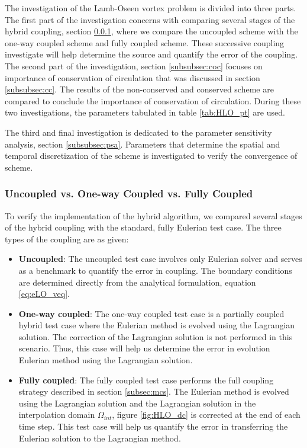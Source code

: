 The investigation of the Lamb-Oseen vortex problem is divided into three parts. The first part of the investigation concerns with comparing several stages of the hybrid coupling, section \ref{subsec:UvOvF}, where we compare the uncoupled scheme with the one-way coupled scheme and fully coupled scheme. These successive coupling investigate will help determine the source and quantify the error of the coupling. The second part of the investigation, section \ref{subsubsec:coc} focuses on importance of conservation of circulation that was discussed in section \ref{subsubsec:cc}. The results of the non-conserved and conserved scheme are compared to conclude the importance of conservation of circulation. During these two investigations, the parameters tabulated in table \ref{tab:HLO_pt} are used.

The third and final investigation is dedicated to the parameter sensitivity analysis, section \ref{subsubsec:psa}. Parameters that determine the spatial and temporal discretization of the scheme is investigated to verify the convergence of scheme.

\subsubsection{Uncoupled vs. One-way Coupled vs. Fully Coupled}
\label{subsec:UvOvF}
To verify the implementation of the hybrid algorithm, we compared several stages of the hybrid coupling with the standard, fully Eulerian test case. The three types of the coupling are as given:

\begin{itemize}
\item \textbf{Uncoupled}: The uncoupled test case involves only Eulerian solver and serves as a benchmark to quantify the error in coupling. The boundary conditions are determined directly from the analytical formulation, equation 	\ref{eq:eLO_veq}.
\item \textbf{One-way coupled}: The one-way coupled test case is a partially coupled hybrid test case where the Eulerian method is evolved using the Lagrangian solution. The correction of the Lagrangian solution is not performed in this scenario. Thus, this case will help us determine the error in evolution Eulerian method using the Lagrangian solution.
\item \textbf{Fully coupled}: The fully coupled test case performs the full coupling strategy described in section \ref{subsec:mcs}. The Eulerian method is evolved using the Lagrangian solution and the Lagrangian solution in the interpolation domain $\Omega_{int}$, figure \ref{fig:HLO_dc} is corrected at the end of each time step. This test case will help us quantify the error in transferring the Eulerian solution to the Lagrangian method.
\end{itemize}
	
